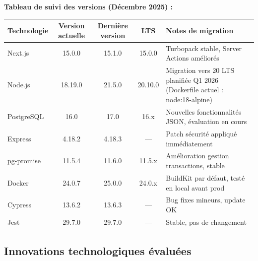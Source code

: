 \begin{exemple}
\textbf{Tableau de suivi des versions (Décembre 2025) :}
\begin{center}
\begin{tabular}{|l|c|c|c|p{5cm}|}
\hline
\textbf{Technologie} & \textbf{Version actuelle} & \textbf{Dernière version} & \textbf{LTS} & \textbf{Notes de migration} \\
\hline
Next.js & 15.0.0 & 15.1.0 & 15.0.0 & Turbopack stable, Server Actions améliorés \\
\hline
Node.js & 18.19.0 & 21.5.0 & 20.10.0 & Migration vers 20 LTS planifiée Q1 2026 (Dockerfile actuel : node:18-alpine) \\
\hline
PostgreSQL & 16.0 & 17.0 & 16.x & Nouvelles fonctionnalités JSON, évaluation en cours \\
\hline
Express & 4.18.2 & 4.18.3 & --- & Patch sécurité appliqué immédiatement \\
\hline
pg-promise & 11.5.4 & 11.6.0 & 11.5.x & Amélioration gestion transactions, stable \\
\hline
Docker & 24.0.7 & 25.0.0 & 24.0.x & BuildKit par défaut, testé en local avant prod \\
\hline
Cypress & 13.6.2 & 13.6.3 & --- & Bug fixes mineurs, update OK \\
\hline
Jest & 29.7.0 & 29.7.0 & --- & Stable, pas de changement \\
\hline
\end{tabular}
\end{center}
\end{exemple}

\subsection{Innovations technologiques évaluées}

